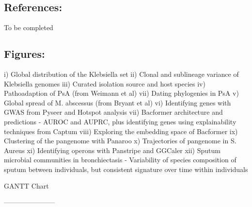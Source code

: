 \subsection*{References:}
To be completed

\subsection*{Figures:} 
i)  Global distribution of the Klebsiella set
ii)  Clonal and sublineage variance of Klebsiella genomes
iii)  Curated isolation source and host species
iv)  Pathoadaption of PsA (from Weimann et al)
vii)  Dating phylogenies in PsA 
v)  Global spread of M. abscessus (from Bryant et al)
vi)  Identifying genes with GWAS from Pyseer and Hotspot analysis
vii)  Bacformer architecture and predictions - AUROC and AUPRC, plus identifying genes using explainability techniques from Captum
viii)  Exploring the embedding space of Bacformer
ix)  Clustering of the pangenome with Panaroo
x)  Trajectories of pangenome in S. Aureus
xi)  Identifying operons with Panstripe and GGCaler
xii) Sputum microbial communities in bronchiectasis - Variability of species composition of sputum between individuals, but consistent signature over time within individuals

GANTT Chart


-----------------------
